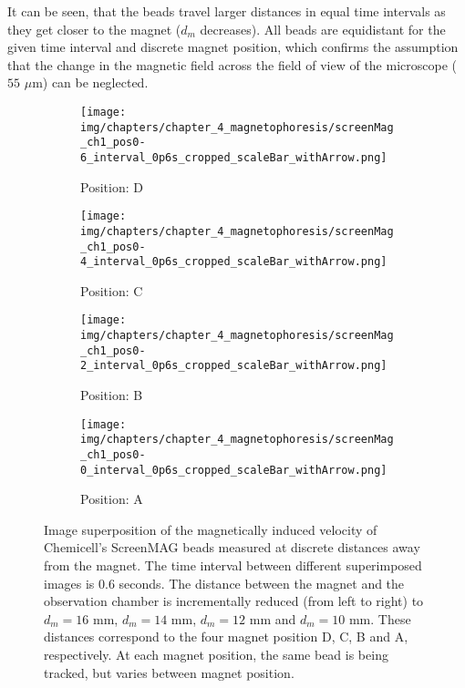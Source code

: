 It can be seen, that the beads travel larger distances in equal time intervals as they get closer to the magnet ($d_{m}$ decreases). All beads are equidistant for the given time interval and discrete magnet position, which confirms the assumption that the change in the magnetic field across the field of view of the microscope ($55$ $\mu$m) can be neglected.

\begin{figure}[htb]
	\centering
    \begin{subfigure}[b]{0.22\textwidth}
		\texttt{[image: img/chapters/chapter\_4\_magnetophoresis/screenMag\_ch1\_pos0-6\_interval\_0p6s\_cropped\_scaleBar\_withArrow.png]}         
        \caption{Position: D}
	\end{subfigure}
	\hfill
    \begin{subfigure}[b]{0.22\textwidth}
		\texttt{[image: img/chapters/chapter\_4\_magnetophoresis/screenMag\_ch1\_pos0-4\_interval\_0p6s\_cropped\_scaleBar\_withArrow.png]}
        \caption{Position: C}
	\end{subfigure}
	\hfill
	\begin{subfigure}[b]{0.22\textwidth}
		\texttt{[image: img/chapters/chapter\_4\_magnetophoresis/screenMag\_ch1\_pos0-2\_interval\_0p6s\_cropped\_scaleBar\_withArrow.png]}
		\caption{Position: B}
	\end{subfigure}		
	\hfill
	\begin{subfigure}[b]{0.22\textwidth}
		\texttt{[image: img/chapters/chapter\_4\_magnetophoresis/screenMag\_ch1\_pos0-0\_interval\_0p6s\_cropped\_scaleBar\_withArrow.png]}
		\caption{Position: A}
	\end{subfigure}
	\caption[Magnetically induced velocities of Chemicell's ScreenMAG beads at different magnetophoretic driving forces]{Image superposition of the magnetically induced velocity of Chemicell's ScreenMAG beads measured at discrete distances away from the magnet. The time interval between different superimposed images is $0.6$ seconds. The distance between the magnet and the observation chamber is incrementally reduced (from left to right) to $d_{m}=16$ mm, $d_{m}=14$ mm, $d_{m}=12$ mm and $d_{m}=10$ mm. These distances correspond to the four magnet position D, C, B and A, respectively. At each magnet position, the same bead is being tracked, but varies between magnet position.}
	\label{fig:particleMovement_screenMag}
\end{figure} 

